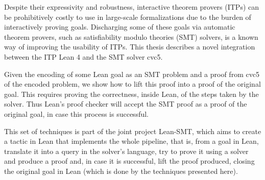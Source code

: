 Despite their expressivity and robustness, interactive theorem provers (ITPs)
can be prohibitively costly to use in large-scale formalizations due to the burden of
interactively proving goals.
%
Discharging some of these goals via automatic theorem provers, such as
satisfiability modulo theories (SMT) solvers, is a known way of improving the
usability of ITPs.
%
This thesis describes a novel integration between the ITP
Lean 4 and the SMT solver cvc5.

Given the encoding of some Lean goal as an SMT problem and a proof from
cvc5 of the encoded problem, we show how to lift this proof into a proof
of the original goal.
%
This requires proving the correctness, inside Lean, of the steps taken by the
solver. Thus Lean's proof checker will accept the SMT proof as a proof of the original goal, in case this process is successful.

This set of techniques is part of the joint project Lean-SMT, which aims to create a
tactic in Lean that implements the whole pipeline, that is, from a goal in
Lean, translate it into a query in the solver's language, try to prove it using
a solver and produce a proof and, in case it is successful, lift the proof produced,
closing the original goal in Lean (which is done by the techniques presented here).
